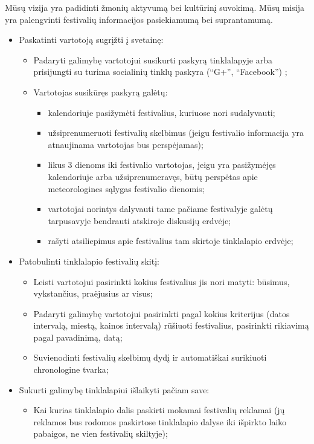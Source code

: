 \documentclass{VUMIFPSkursinis}
\begin{document}
Mūsų vizija yra padidinti žmonių aktyvumą bei kultūrinį suvokimą.
Mūsų misija yra palengvinti festivalių informacijos pasiekiamumą bei suprantamumą.
\begin{itemize}
\item Paskatinti vartotoją sugrįžti į svetainę:
	\begin{itemize}
    \item Padaryti galimybę vartotojui susikurti paskyrą tinklalapyje arba prisijungti su turima socialinių tinklų paskyra (“G+”, “Facebook”) ;
    \item Vartotojas susikūręs paskyrą galėtų:
        \begin{itemize}
        \item kalendoriuje pasižymėti festivalius, kuriuose nori sudalyvauti;
        \item užsiprenumeruoti festivalių skelbimus (jeigu festivalio informacija yra atnaujinama vartotojas bus perspėjamas);
        \item likus 3 dienoms iki festivalio vartotojas, jeigu yra pasižymėjęs kalendoriuje arba užsiprenumeravęs, būtų perspėtas apie meteorologines sąlygas festivalio dienomis;
        \item vartotojai norintys dalyvauti tame pačiame festivalyje galėtų tarpusavyje bendrauti atskiroje diskusijų erdvėje;
        \item rašyti atsiliepimus apie festivalius tam skirtoje tinklalapio erdvėje;
        \end{itemize}
    \end{itemize}
\item Patobulinti tinklalapio festivalių skitį:
    \begin{itemize}
    \item Leisti vartotojui pasirinkti kokius festivalius jis nori matyti: būsimus, vykstančius, praėjusius ar visus;
    \item Padaryti galimybę vartotojui pasirinkti pagal kokius kriterijus (datos intervalą, miestą, kainos intervalą) rūšiuoti festivalius, pasirinkti rikiavimą pagal pavadinimą, datą;
    \item Suvienodinti festivalių skelbimų dydį ir automatiškai surikiuoti chronologine tvarka;
    \end{itemize}
\item Sukurti galimybę tinklalapiui išlaikyti pačiam save:
    \begin{itemize}
    \item Kai kurias tinklalapio dalis paskirti mokamai festivalių reklamai (jų reklamos bus rodomos paskirtose tinklalapio dalyse iki išpirkto laiko pabaigos, ne vien festivalių skiltyje);

\end{itemize}
\end{itemize}
\end{document}

